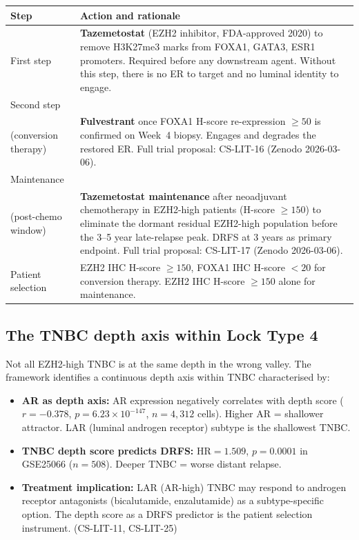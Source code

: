 \documentclass[12pt, a4paper]{article}
\begin{document}
\begin{center}
\begin{tabular}{p{3.5cm}p{9cm}}
\toprule
\textbf{Step} & \textbf{Action and rationale} \\
\midrule
First step
& \textbf{Tazemetostat} (EZH2 inhibitor, FDA-approved
  2020) to remove H3K27me3 marks from FOXA1, GATA3,
  ESR1 promoters. Required before any downstream agent.
  Without this step, there is no ER to target and no
  luminal identity to engage. \\[0.3em]
Second step\\(conversion therapy)
& \textbf{Fulvestrant} once FOXA1 H-score
  re-expression $\geq50$ is confirmed on Week~4
  biopsy. Engages and degrades the restored ER.
  Full trial proposal: CS-LIT-16 (Zenodo 2026-03-06).
  \\[0.3em]
Maintenance\\(post-chemo window)
& \textbf{Tazemetostat maintenance} after neoadjuvant
  chemotherapy in EZH2-high patients (H-score $\geq150$)
  to eliminate the dormant residual EZH2-high population
  before the 3--5 year late-relapse peak. DRFS at 3 years
  as primary endpoint. Full trial proposal: CS-LIT-17
  (Zenodo 2026-03-06). \\[0.3em]
Patient selection
& EZH2 IHC H-score $\geq150$, FOXA1 IHC H-score
  $<20$ for conversion therapy. EZH2 IHC H-score
  $\geq150$ alone for maintenance. \\
\bottomrule
\end{tabular}
\end{center}

\subsection{The TNBC depth axis within Lock Type 4}

Not all EZH2-high TNBC is at the same depth in the
wrong valley. The framework identifies a continuous
depth axis within TNBC characterised by:

\begin{itemize}[noitemsep]
  \item \textbf{AR as depth axis:}
        AR expression negatively correlates with
        depth score ($r=-0.378$, $p=6.23\times10^{-147}$,
        $n=4{,}312$ cells). Higher AR = shallower
        attractor. LAR (luminal androgen receptor)
        subtype is the shallowest TNBC.
  \item \textbf{TNBC depth score predicts DRFS:}
        HR$=1.509$, $p=0.0001$ in GSE25066 ($n=508$).
        Deeper TNBC = worse distant relapse.
  \item \textbf{Treatment implication:}
        LAR (AR-high) TNBC may respond to androgen
        receptor antagonists (bicalutamide, enzalutamide)
        as a subtype-specific option. The depth score
        as a DRFS predictor is the patient selection
        instrument. (CS-LIT-11, CS-LIT-25)
\end{itemize}
\end{document}
